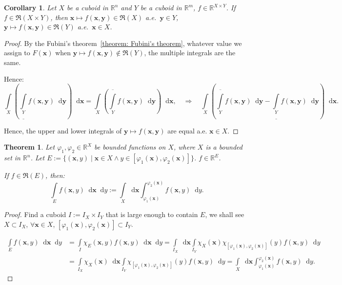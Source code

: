 \documentclass[openany]{book}
\theoremstyle{plain}
\newtheorem{theorem}{Theorem}[section] %
\newtheorem{corollary}{Corollary} %
\theoremstyle{definition}
\newcommand{\dif}{\mathop{}\!\mathrm{d}} %
\newcommand*{\bv}{\boldsymbol} %
\begin{document}
\begin{corollary}
	Let $X$ be a cuboid in $\mathbb R^n$ and $Y$ be a cuboid in $\mathbb R^m$, $f \in \mathbb R^{X \times Y}$. 
	If $f \in \mathfrak R(X \times Y)$, then $\bv x \mapsto f(\bv x, \bv y) \in \mathfrak R(X)$ a.e.\ $\bv y \in Y$, $\bv y \mapsto f(\bv x, \bv y) \in \mathfrak R(Y)$ a.e.\ $\bv x \in X$.
\end{corollary}
\begin{proof}
	By the Fubini's theorem~\ref{theorem: Fubini's theorem}, whatever value we assign to $F(\bv x)$ when $\bv y \mapsto f(\bv x, \bv y) \notin \mathfrak R(Y)$, the multiple integrals are the same.

	Hence:
	\begin{equation*}
		\int\limits_X \left(
			\underline{\int\limits_Y} f(\bv x, \bv y) \dif \bv y 
		\right) \dif \bv x
		= \int\limits_X \left(
			\overline{\int\limits_Y} f(\bv x, \bv y) \dif \bv y 
		\right) \dif \bv x,
		\quad\Rightarrow\quad
		\int\limits_X \left(
			\overline{\int\limits_Y} f(\bv x, \bv y) \dif \bv y
			- \underline{\int\limits_Y} f(\bv x, \bv y) \dif \bv y 
		\right) \dif \bv x.
	\end{equation*}

	Hence, the upper and lower integrals of $\bv y \mapsto f(\bv x, \bv y)$ are equal a.e. $\bv x \in X$.
\end{proof}

\begin{theorem}
	Let $\varphi_1, \varphi_2 \in \mathbb R^X$ be bounded functions on $X$, where $X$ is a bounded set in $\mathbb R^n$. 
	Let $E := \{ (\bv x, y) \mid \bv x \in X \wedge y \in [\varphi_1(\bv x), \varphi_2(\bv x)] \}$.
	$f \in \mathbb R^E$.

	If $f \in \mathfrak R(E)$, then:
	\begin{equation*}
		\int\limits_E f(\bv x, y) \dif \bv x \dif y 
			:= \int\limits_X \dif \bv x \int^{\varphi_2(\bv x)}_{\varphi_1(\bv x)} f(\bv x, y) \dif y.
	\end{equation*}
\end{theorem}
\begin{proof}
	Find a cuboid $I := I_X \times I_Y$ that is large enough to contain $E$, we shall see $X \subset I_X$, $\forall \bv x \in X$, $[\varphi_1(\bv x), \varphi_2(\bv x)] \subset I_Y$. 

	\begin{align*}
		\int\limits_E f(\bv x, y) \dif \bv x \dif y
		&= \int\limits_I \chi_E(\bv x, y) f(\bv x, y) \dif \bv x \dif y
		= \int\limits_{I_X} \dif \bv x \int\limits_{I_Y} \chi_X (\bv x) \chi_{[\varphi_1(\bv x), \varphi_2(\bv x)]} (y) f(\bv x, y)  \dif y
		\\
		&= \int\limits_{I_X} \chi_X (\bv x) \dif \bv x 
			\int\limits_{I_Y}  \chi_{[\varphi_1(\bv x), \varphi_2(\bv x)]} (y) f(\bv x, y)  \dif y
		= \int\limits_X \dif \bv x \int^{\varphi_2(\bv x)}_{\varphi_1(\bv x)} f(\bv x, y) \dif y.
	\end{align*}
\end{proof}
\end{document}
